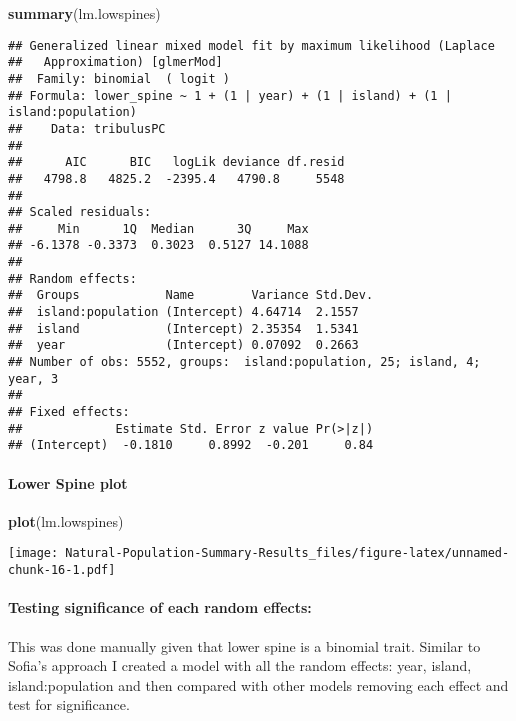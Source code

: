 \documentclass[
]{article}
\newenvironment{Shaded}{\begin{snugshade}}{\end{snugshade}}
\newcommand{\KeywordTok}[1]{\textcolor[rgb]{0.13,0.29,0.53}{\textbf{#1}}}
\newcommand{\NormalTok}[1]{#1}
\begin{document}
\begin{Shaded}
\begin{Highlighting}[]
\KeywordTok{summary}\NormalTok{(lm.lowspines)}
\end{Highlighting}
\end{Shaded}

\begin{verbatim}
## Generalized linear mixed model fit by maximum likelihood (Laplace
##   Approximation) [glmerMod]
##  Family: binomial  ( logit )
## Formula: lower_spine ~ 1 + (1 | year) + (1 | island) + (1 | island:population)
##    Data: tribulusPC
## 
##      AIC      BIC   logLik deviance df.resid 
##   4798.8   4825.2  -2395.4   4790.8     5548 
## 
## Scaled residuals: 
##     Min      1Q  Median      3Q     Max 
## -6.1378 -0.3373  0.3023  0.5127 14.1088 
## 
## Random effects:
##  Groups            Name        Variance Std.Dev.
##  island:population (Intercept) 4.64714  2.1557  
##  island            (Intercept) 2.35354  1.5341  
##  year              (Intercept) 0.07092  0.2663  
## Number of obs: 5552, groups:  island:population, 25; island, 4; year, 3
## 
## Fixed effects:
##             Estimate Std. Error z value Pr(>|z|)
## (Intercept)  -0.1810     0.8992  -0.201     0.84
\end{verbatim}

\hypertarget{lower-spine-plot}{%
\paragraph{Lower Spine plot}\label{lower-spine-plot}}

\begin{Shaded}
\begin{Highlighting}[]
\KeywordTok{plot}\NormalTok{(lm.lowspines)}
\end{Highlighting}
\end{Shaded}

\texttt{[image: Natural-Population-Summary-Results\_files/figure-latex/unnamed-chunk-16-1.pdf]}

\hypertarget{testing-significance-of-each-random-effects-5}{%
\paragraph{Testing significance of each random
effects:}\label{testing-significance-of-each-random-effects-5}}

This was done manually given that lower spine is a binomial trait.
Similar to Sofia's approach I created a model with all the random
effects: year, island, island:population and then compared with other
models removing each effect and test for significance.
\end{document}
